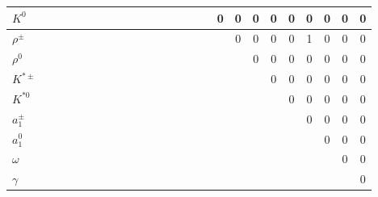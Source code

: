 \documentclass[6pt]{article}
\begin{document}
\begin{landscape}
\begin{tabular}{|l||cccc|cc|ccc|ccc|cccc|cccc|cccc|}
$K^0$  &  &  &  &  &  &  &  &  &  &  &  &  &  &  &  & 0 & 0 & 0 & 0 & 0 & 0 & 0 & 0 & 0 \\
\hline 
$\rho^{\pm}$  &  &  &  &  &  &  &  &  &  &  &  &  &  &  &  &  & 0 & 0 & 0 & 0 & 1 & 0 & 0 & 0 \\
$\rho^0$  &  &  &  &  &  &  &  &  &  &  &  &  &  &  &  &  &  & 0 & 0 & 0 & 0 & 0 & 0 & 0 \\
$K^{*\pm}$  &  &  &  &  &  &  &  &  &  &  &  &  &  &  &  &  &  &  & 0 & 0 & 0 & 0 & 0 & 0 \\
$K^{*0}$  &  &  &  &  &  &  &  &  &  &  &  &  &  &  &  &  &  &  &  & 0 & 0 & 0 & 0 & 0 \\
\hline 
$a_1^{\pm}$  &  &  &  &  &  &  &  &  &  &  &  &  &  &  &  &  &  &  &  &  & 0 & 0 & 0 & 0 \\
$a_1^0$  &  &  &  &  &  &  &  &  &  &  &  &  &  &  &  &  &  &  &  &  &  & 0 & 0 & 0 \\
$\omega$  &  &  &  &  &  &  &  &  &  &  &  &  &  &  &  &  &  &  &  &  &  &  & 0 & 0 \\
$\gamma$  &  &  &  &  &  &  &  &  &  &  &  &  &  &  &  &  &  &  &  &  &  &  &  & 0 \\
\hline \end{tabular} \end{landscape}
\end{document}
